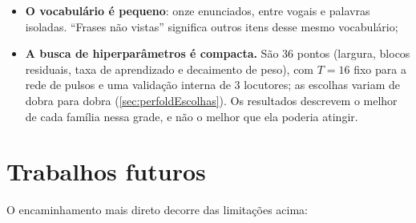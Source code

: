 \begin{itemize}
			(\autoref{sec:trabalhosMaisRecentes});
			\item \textbf{O vocabulário é pequeno}: onze enunciados, entre vogais e
			palavras isoladas. ``Frases não vistas'' significa outros itens desse
			mesmo vocabulário;
			\item \textbf{A busca de hiperparâmetros é compacta.} São 36 pontos
			(largura, blocos residuais, taxa de aprendizado e decaimento de peso),
			com $T = 16$ fixo para a rede de pulsos e uma validação interna de 3
			locutores; as escolhas variam de dobra para dobra
			(\autoref{sec:perfoldEscolhas}). Os resultados descrevem o melhor de
			cada família nessa grade, e não o melhor que ela poderia atingir.
		\end{itemize}

	\section{Trabalhos futuros}

		\par O encaminhamento mais direto decorre das limitações acima:

